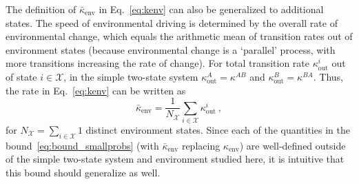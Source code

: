 \documentclass[entropy,article,
submit,
moreauthors,pdftex,10pt,a4paper]{mdpi}
\newcommand{\kenv}{\kappa_\mathrm{env}}
\newcommand{\kenvAv}{\bar{\kappa}_\mathrm{env}}
\begin{document}
The definition of $\kenvAv$ in Eq.~\eqref{eq:kenv} can also be generalized to additional states. 
The speed of environmental driving is determined by the overall rate of environmental change, which equals the 
arithmetic mean of transition rates out of environment states (because environmental change is a `parallel' process, with more transitions increasing the rate of change).
For total transition rate $\kappa_\mathrm{out}^{i}$ out of state $i \in \mathcal{X}$, in the simple two-state system $\kappa_\mathrm{out}^A=\kappa^{AB}$ and $\kappa_\mathrm{out}^B=\kappa^{BA}$. Thus, the rate in Eq.~\eqref{eq:kenv} can be written as 
\begin{equation}
	\label{eq:kenv_general}
\kenvAv=\frac{1}{N_\mathcal{X}}\sum_{i\in \mathcal{X}} \kappa_\mathrm{out}^{i} \ ,
\end{equation}
for $N_\mathcal{X}=\sum\limits_{i\in \mathcal{X}} 1$ distinct environment states. 
Since each of the quantities in the bound~\eqref{eq:bound_smallprobs} (with $\kenvAv$ replacing $\kenv$) are well-defined outside of the simple two-state system and environment studied here, it is 
intuitive
that this bound 
should
generalize as well. 




\end{document}
